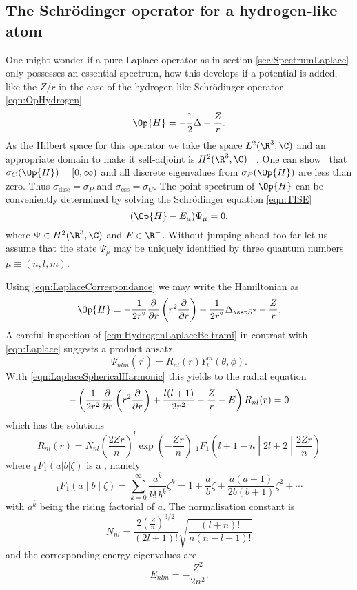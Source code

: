 \subsection{The Schrödinger operator for a hydrogen-like atom}
\label{sec:HydrogenAtom}
One might wonder if a pure Laplace operator as in section \vref{sec:SpectrumLaplace}
only possesses an essential spectrum,
how this develops if a potential is added,
like the $Z / r$ in the case of
the hydrogen-like Schrödinger operator \eqref{eqn:OpHydrogen}
\[
	\Op{H} = -\frac12 \Delta - \frac{Z}{r}.
\]
As the Hilbert space for this operator we take the \QM space $L^2(\R^3, \C)$
and an appropriate domain to make it self-adjoint is $H^2(\R^3, \C)$%
~\cite[p.~38]{Helffer2013}.
One can show~\cite{Davies2007,Teschl2014} that $\sigma_C(\Op{H}) = [0, \infty)$
and all discrete eigenvalues from $\sigma_P(\Op{H})$ are less than zero.
Thus $\sigma_\text{disc} = \sigma_P$ and $\sigma_\text{ess} = \sigma_C$.
The point spectrum of $\Op{H}$ can be conveniently
determined by solving the Schrödinger equation \eqref{eqn:TISE}
\begin{equation}
	( \Op{H} - E_{\mu} ) \Psi_\mu = 0,
\end{equation}
where $\Psi \in H^2(\R^3, \C)$ and $E \in \R^-$.
Without jumping ahead too far let us assume that the state
$\Psi_\mu$
may be uniquely identified by three quantum numbers $\mu \equiv (n, l, m)$.

\noindent
Using \eqref{eqn:LaplaceCorrespondance} we may write the Hamiltonian as
\begin{equation}
	\label{eqn:HydrogenLaplaceBeltrami}
	\Op{H} = -\frac{1}{2r^2} \laplaceRadial -\frac{1}{2r^2} \laplaceSphere - \frac{Z}{r}.
\end{equation}
A careful inspection of \eqref{eqn:HydrogenLaplaceBeltrami}
in contrast with \eqref{eqn:Laplace}
suggests a product ansatz
\[ \Psi_{nlm}(\vec{r}) = R_{nl}(r) Y_l^m(\theta, \phi). \]
%
With \eqref{eqn:LaplaceSphericalHarmonic} this yields to the radial equation
\begin{equation}
	- \left( \frac{1}{2r^2} \frac{\partial}{\partial r} \left( r^2 \frac{\partial}{\partial r} \right) + \frac{l (l+1)}{2 r^2} - \frac{Z}{r} - E \right) R_{nl}(r) = 0
	\label{eqn:HydrogenRadial}
\end{equation}
which has the solutions~\cite{Mueller2000}
\begin{equation}
	 R_{nl}(r) = N_{nl} \left(\frac{2Zr}{n}\right)^l \exp\left(-\frac{Zr}{n} \right)
\;_1F_1\left(l+1-n \middle| 2l+2 \middle|\frac{2Zr}{n}\right)
	\label{eqn:HydrogenRadialSolution}
\end{equation}
where $_1F_1\left(a|b|\zeta\right)$ is a ,
namely~\cite{Avery2006}
\[ _1F_1\left(a \middle| b \middle| \zeta\right) =
\sum_{k=0}^\infty \frac{a^{\bar{k}}}{k! \, b^{\bar{k}}} \zeta^k =
1 + \frac{a}{b} \zeta + \frac{a(a+1)}{2b(b+1)} \zeta^2 + \cdots \]
with $a^{\bar{k}}$ being the rising factorial of $a$.
The normalisation constant is
\[ N_{nl} = \frac{2 \left( \frac{Z}{n} \right)^{3/2}}{(2l+1)!} \sqrt{ \frac{(l+n)!}{n (n-l-1)!}} \]
and the corresponding energy eigenvalues are
\begin{equation}
	E_{nlm} = - \frac{Z^2}{2n^2}.
	\label{eqn:HydrogenEnergyLevels}
\end{equation}

